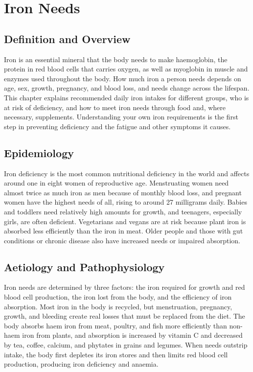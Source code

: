 \chapter{Iron Needs}

\section*{Definition and Overview}
Iron is an essential mineral that the body needs to make haemoglobin, the protein in red blood cells that carries oxygen, as well as myoglobin in muscle and enzymes used throughout the body. How much iron a person needs depends on age, sex, growth, pregnancy, and blood loss, and needs change across the lifespan. This chapter explains recommended daily iron intakes for different groups, who is at risk of deficiency, and how to meet iron needs through food and, where necessary, supplements. Understanding your own iron requirements is the first step in preventing deficiency and the fatigue and other symptoms it causes.

\section*{Epidemiology}
Iron deficiency is the most common nutritional deficiency in the world and affects around one in eight women of reproductive age. Menstruating women need almost twice as much iron as men because of monthly blood loss, and pregnant women have the highest needs of all, rising to around 27 milligrams daily. Babies and toddlers need relatively high amounts for growth, and teenagers, especially girls, are often deficient. Vegetarians and vegans are at risk because plant iron is absorbed less efficiently than the iron in meat. Older people and those with gut conditions or chronic disease also have increased needs or impaired absorption.

\section*{Aetiology and Pathophysiology}
Iron needs are determined by three factors: the iron required for growth and red blood cell production, the iron lost from the body, and the efficiency of iron absorption. Most iron in the body is recycled, but menstruation, pregnancy, growth, and bleeding create real losses that must be replaced from the diet. The body absorbs haem iron from meat, poultry, and fish more efficiently than non-haem iron from plants, and absorption is increased by vitamin C and decreased by tea, coffee, calcium, and phytates in grains and legumes. When needs outstrip intake, the body first depletes its iron stores and then limits red blood cell production, producing iron deficiency and anaemia.

